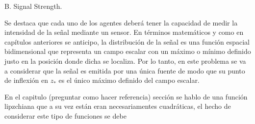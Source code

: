 B. Signal Strength.

Se destaca que cada uno de los agentes deberá tener la capacidad de medir la intensidad de la señal mediante un sensor. En términos matemáticos y como en capítulos anteriores se anticipo, la distribución de la señal es una función espacial bidimensional que representa un campo escalar con un máximo o mínimo definido justo en la posición donde dicha se localiza. Por lo tanto, en este problema se va a considerar que la señal es emitida por una única fuente de modo que su punto de inflexión en $z_*$ es el único máximo definido del campo escalar.

En el capitulo (preguntar como hacer referencia) sección se hablo de una función lipzchiana que a su vez están eran necesariamentes cuadráticas, el hecho de considerar este tipo de funciones se debe 



